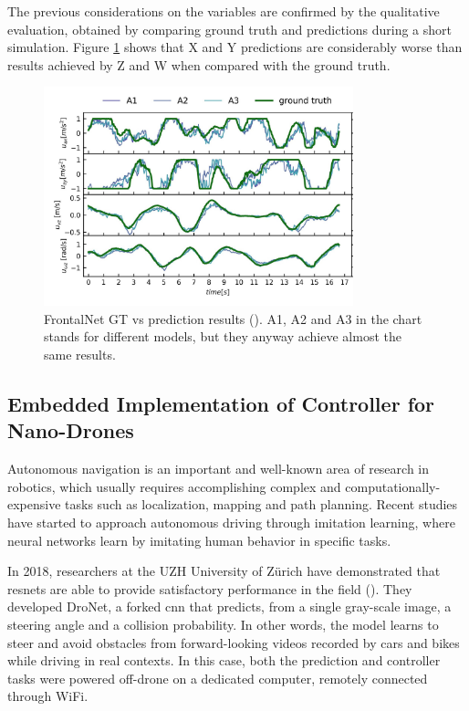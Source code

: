 \medskip

The previous considerations on the variables are confirmed by the qualitative evaluation, obtained by comparing ground truth and predictions during a short simulation. Figure \ref{fig:frontalnet-gt-pred} shows that X and Y predictions are considerably worse than results achieved by Z and W when compared with the ground truth.

\begin{figure}[!htb]
	\centering
	\includegraphics[width=0.8\textwidth]{"contents/images/03-frontalnet-gt-pred-2"}
	\caption[FrontalNet GT vs prediction results (\cite{mantegazza2019visionbased})]{FrontalNet GT vs prediction results (\cite{mantegazza2019visionbased}). A1, A2 and A3 in the chart stands for different models, but they anyway achieve almost the same results.}
	\label{fig:frontalnet-gt-pred}
\end{figure}


\subsection{Embedded Implementation of Controller for Nano-Drones}
\label{subsec:sota-nicky}

Autonomous navigation is an important and well-known area of research in robotics, which usually requires accomplishing complex and computationally-expensive tasks such as localization, mapping and path planning. Recent studies have started to approach autonomous driving through imitation learning\cite{imitation-learning}, where neural networks learn by imitating human behavior in specific tasks. 

\medskip

In 2018, researchers at the UZH University of Zürich have demonstrated that \gls{resnet}s are able to provide satisfactory performance in the field (\cite{Loquercio_2018}). They developed DroNet, a forked \gls{cnn} that predicts, from a single gray-scale image, a steering angle and a collision probability. In other words, the model learns to steer and avoid obstacles from forward-looking videos recorded by cars and bikes while driving in real contexts. In this case, both the prediction and controller tasks were powered off-drone on a dedicated computer, remotely connected through WiFi. 

